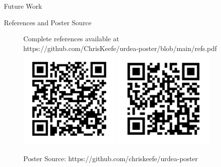 \documentclass[final]{beamer}
\newlength{\sepwidth}
\newlength{\colwidth}
\newcommand{\separatorcolumn}{\begin{column}{\sepwidth}\end{column}}
\begin{document}
\begin{frame}[t]
\begin{columns}[t]
\begin{column}{\colwidth}
\begin{block}{Future Work}
  \end{block}

  \begin{block}{References and Poster Source}
    \nocite{*}
    
    \begin{figure}
      \begin{minipage}[c]{\textwidth}
        Complete references available at https://github.com/ChrisKeefe/urdea-poster/blob/main/refs.pdf
        \newline
        \includegraphics[height=5cm]{assets/refs_qr.png}
        \hfill
        \includegraphics[height=5cm]{assets/repo}
      \end{minipage}
      \begin{minipage}[c]{\textwidth}
        \hfill
        Poster Source: https://github.com/chriskeefe/urdea-poster
      \end{minipage}
    \end{figure}
    
  \end{block}

\end{column}

\separatorcolumn
\end{columns}
\end{frame}
\end{document}
